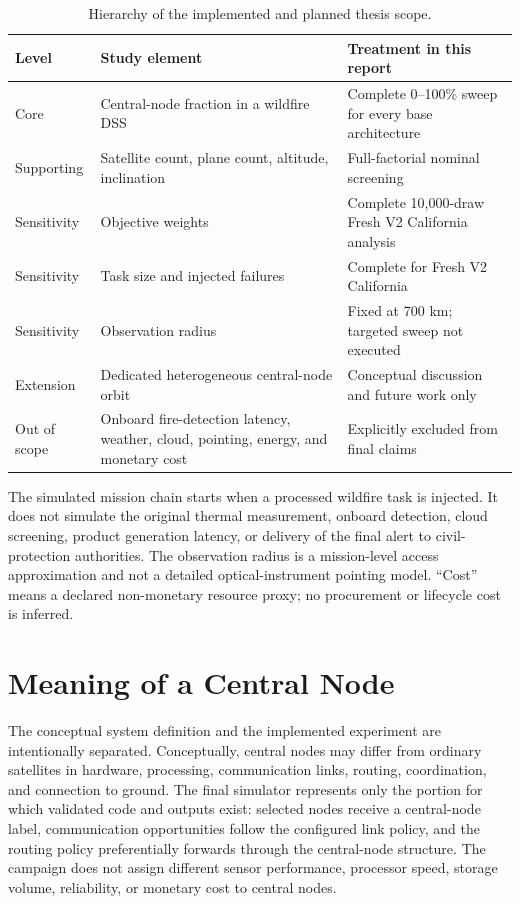\begin{table}[htbp]
\centering
\caption{Hierarchy of the implemented and planned thesis scope.}
\label{tab:scope_hierarchy_new}
\begin{tabularx}{\textwidth}{L{0.17\textwidth}L{0.31\textwidth}Y}
\toprule
Level & Study element & Treatment in this report \\
\midrule
Core & Central-node fraction in a wildfire DSS & Complete 0--100\% sweep for every base architecture \\
Supporting & Satellite count, plane count, altitude, inclination & Full-factorial nominal screening \\
Sensitivity & Objective weights & Complete 10,000-draw Fresh V2 California analysis \\
Sensitivity & Task size and injected failures & Complete for Fresh V2 California \\
Sensitivity & Observation radius & Fixed at 700 km; targeted sweep not executed \\
Extension & Dedicated heterogeneous central-node orbit & Conceptual discussion and future work only \\
Out of scope & Onboard fire-detection latency, weather, cloud, pointing, energy, and monetary cost & Explicitly excluded from final claims \\
\bottomrule
\end{tabularx}
\end{table}

The simulated mission chain starts when a processed wildfire task is injected. It does not simulate the original thermal measurement, onboard detection, cloud screening, product generation latency, or delivery of the final alert to civil-protection authorities. The observation radius is a mission-level access approximation and not a detailed optical-instrument pointing model. ``Cost'' means a declared non-monetary resource proxy; no procurement or lifecycle cost is inferred.

\section{Meaning of a Central Node}

The conceptual system definition and the implemented experiment are intentionally separated. Conceptually, central nodes may differ from ordinary satellites in hardware, processing, communication links, routing, coordination, and connection to ground. The final simulator represents only the portion for which validated code and outputs exist: selected nodes receive a central-node label, communication opportunities follow the configured link policy, and the routing policy preferentially forwards through the central-node structure. The campaign does not assign different sensor performance, processor speed, storage volume, reliability, or monetary cost to central nodes.

